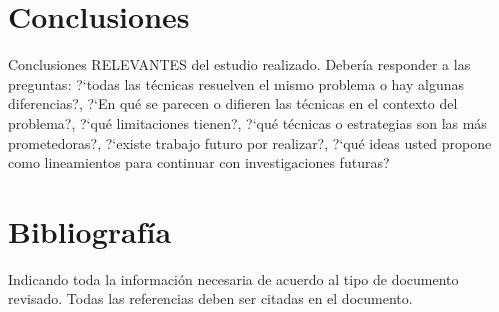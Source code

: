 \documentclass[letter, 10pt]{article}
\begin{document}
\section{Conclusiones}
Conclusiones RELEVANTES del estudio realizado. Deber\'ia responder a las preguntas: ?`todas las t\'ecnicas resuelven el mismo problema o hay algunas diferencias?, ?`En qu\'e se parecen o difieren las t\'ecnicas en el contexto del problema?, ?`qu\'e limitaciones tienen?, ?`qu\'e t\'ecnicas o estrategias son las m\'as prometedoras?, ?`existe trabajo futuro por realizar?, ?`qu\'e ideas usted propone como lineamientos para continuar con investigaciones futuras?


\section{Bibliograf\'ia}
Indicando toda la informaci\'on necesaria de acuerdo al tipo de documento revisado. Todas las referencias deben ser citadas en el documento.


\end{document}
